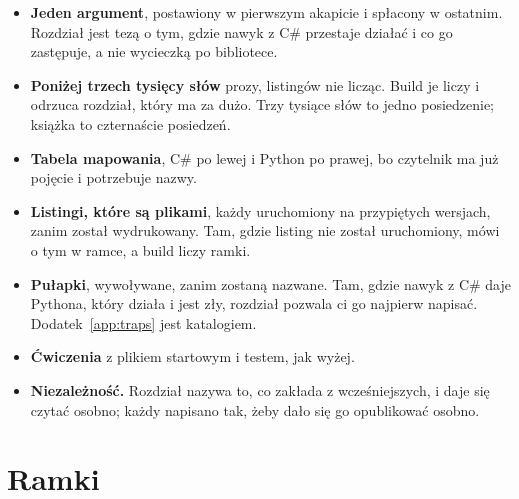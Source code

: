 \begin{itemize}[leftmargin=1.4em, itemsep=2pt]
  \item \textbf{Jeden argument}, postawiony w pierwszym akapicie i spłacony w
        ostatnim. Rozdział jest tezą o tym, gdzie nawyk z C\# przestaje
        działać i co go zastępuje, a nie wycieczką po bibliotece.
  \item \textbf{Poniżej trzech tysięcy słów} prozy, listingów nie licząc.
        Build je liczy i odrzuca rozdział, który ma za dużo. Trzy tysiące
        słów to jedno posiedzenie; książka to czternaście posiedzeń.
  \item \textbf{Tabela mapowania}, C\# po lewej i Python po prawej, bo
        czytelnik ma już pojęcie i potrzebuje nazwy.
  \item \textbf{Listingi, które są plikami}, każdy uruchomiony na przypiętych
        wersjach, zanim został wydrukowany. Tam, gdzie listing nie został
        uruchomiony, mówi o tym w ramce, a build liczy ramki.
  \item \textbf{Pułapki}, wywoływane, zanim zostaną nazwane. Tam, gdzie nawyk
        z C\# daje Pythona, który działa i jest zły, rozdział pozwala ci go
        najpierw napisać. Dodatek~\ref{app:traps} jest katalogiem.
  \item \textbf{Ćwiczenia} z plikiem startowym i testem, jak wyżej.
  \item \textbf{Niezależność.} Rozdział nazywa to, co zakłada z wcześniejszych,
        i daje się czytać osobno; każdy napisano tak, żeby dało się go
        opublikować osobno.
\end{itemize}

\section*{Ramki}

